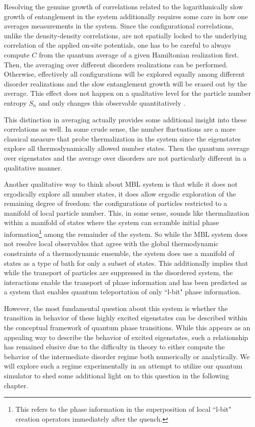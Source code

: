 Resolving the genuine growth of correlations related to the logarithmically slow growth of entanglement in the system additionally requires some care in how one averages measurements in the system. Since the configurational correlations, unlike the density-density correlations, are not spatially locked to the underlying correlation of the applied on-site potentials, one has to be careful to always compute $C$ from the quantum average of a given Hamiltonian realization first. Then, the averaging over different disorders realizations can be performed. Otherwise, effectively all configurations will be explored equally among different disorder realizations and the slow entanglement growth will be erased out by the average. This effect does not happen on a qualitative level for the particle number entropy $S_n$ and only changes this observable quantitatively \cite{Lukin2019}.

This distinction in averaging actually provides some additional insight into these correlations as well. In some crude sense, the number fluctuations are a more classical measure that probe thermalization in the system since the eigenstates explore all thermodynamically allowed number states. Then the quantum average over eigenstates and the average over disorders are not particularly different in a qualitative manner. 

Another qualitative way to think about MBL system is that while it does not ergodically explore all number states, it does allow ergodic exploration of the remaining degree of freedom: the configurations of particles restricted to a manifold of local particle number. This, in some sense, sounds like thermalization within a manifold of states where the system can scramble initial phase information\footnote{This refers to the phase information in the superposition of local ``l-bit" creation operators immediately after the quench.} among the remainder of the system. So while the MBL system does not resolve local observables that agree with the global thermodynamic constraints of a thermodynamic ensemble, the system does use a manifold of states as a type of bath for only a subset of states. This additionally implies that while the transport of particles are suppressed in the disordered system, the interactions enable the transport of phase information and has been predicted as a system that enables quantum teleportation of only ``l-bit" phase information.

However, the most fundamental question about this system is whether the transition in behavior of these highly excited eigenstates can be described within the conceptual framework of quantum phase transitions. While this appears as an appealing way to describe the behavior of excited eigenstates, such a relationship has remained elusive due to the difficulty in theory to either compute the behavior of the intermediate disorder regime both numerically or analytically. We will explore such a regime experimentally in an attempt to utilize our quantum simulator to shed some additional light on to this question in the following chapter\cite{Rispoli2018}. 

